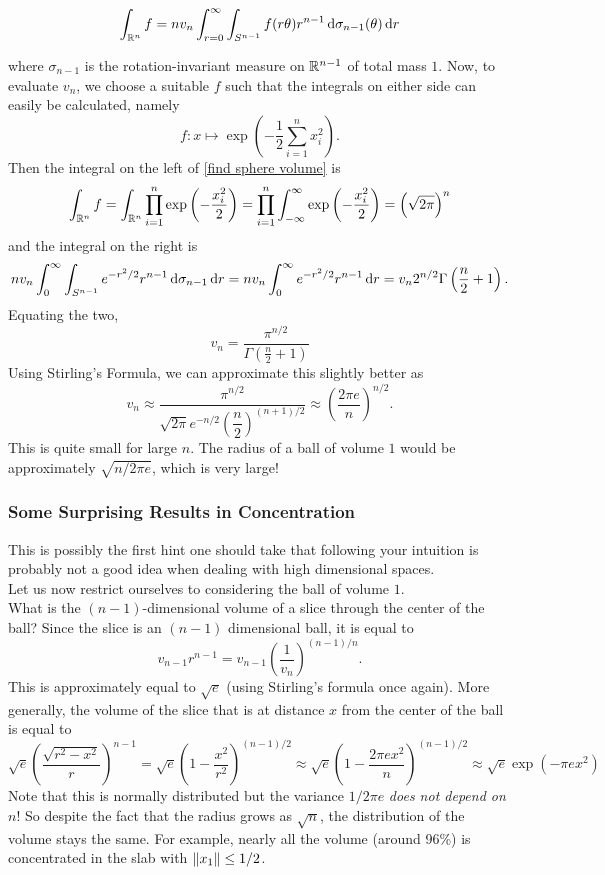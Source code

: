 \begin{equation}
\label{find sphere volume}
    \int_{\mathbb{R}^n} f = nv_n \int_{r=0}^\infty \int_{S^{n-1}} f(r\theta) r^{n-1} \operatorname{d}\!{\sigma}_{n-1}(\theta) \operatorname{d}\!{r}
\end{equation}

where $\sigma_{n-1}$ is the rotation-invariant measure on $\mathbb{R}^{n-1}$ of total mass $1$. Now, to evaluate $v_n$, we choose a suitable $f$ such that the integrals on either side can easily be calculated, namely
\[f: x\mapsto \exp\left(-\frac{1}{2}\sum_{i=1}^n x_i^2\right).\]
Then the integral on the left of \ref{find sphere volume} is
\[
\int_{\mathbb{R}^n}f = \int_{\mathbb{R}^n}\prod_{i=1}^n \exp\left(-\frac{x_i^2}{2}\right) = \prod_{i=1}^n \int_{-\infty}^\infty \exp\left(-\frac{x_i^2}{2}\right) = \left(\sqrt{2\pi}\right)^n
\]
and the integral on the right is
\[
nv_n\int_0^\infty \int_{S^{n-1}} e^{-r^2/2}r^{n-1}\operatorname{d}\!{\sigma}_{n-1}\operatorname{d}\!{r} = nv_n\int_0^\infty e^{-r^2/2}r^{n-1}\operatorname{d}\!{r} = v_n 2^{n/2}\Gamma\left(\frac{n}{2}+1\right).
\]
Equating the two,
\[ v_n = \frac{\pi^{n/2}}{\Gamma\left(\frac{n}{2}+1\right)} \]
Using Stirling's Formula, we can approximate this slightly better as
\[ v_n \approx \dfrac{\pi^{n/2}}{\sqrt{2\pi} e^{-n/2}\left(\dfrac{n}{2}\right)^{(n+1)/2}} \approx \left(\frac{2\pi e}{n}\right)^{n/2}. \]
This is quite small for large $n$. The radius of a ball of volume $1$ would be approximately $\sqrt{n/2\pi e}$, which is very large!\\

\subsubsection{Some Surprising Results in Concentration}

This is possibly the first hint one should take that following your intuition is probably not a good idea when dealing with high dimensional spaces.\\

Let us now restrict ourselves to considering the ball of volume $1$.\\
What is the $(n-1)$-dimensional volume of a slice through the center of the ball? Since the slice is an $(n-1)$ dimensional ball, it is equal to
\[ v_{n-1}r^{n-1} = v_{n-1}\left(\frac{1}{v_n}\right)^{(n-1)/n}. \]
This is approximately equal to $\sqrt{e}$ (using Stirling's formula once again). More generally, the volume of the slice that is at distance $x$ from the center of the ball is equal to
\[ \sqrt{e}\left(\frac{\sqrt{r^2-x^2}}{r}\right)^{n-1} =
\sqrt{e}\left(1-\frac{x^2}{r^2}\right)^{(n-1)/2} \approx
\sqrt{e}\left(1-\frac{2\pi ex^2}{n}\right)^{(n-1)/2} \approx \sqrt{e}\exp(-\pi e x^2)\]
Note that this is normally distributed but the variance $1/2\pi e$ \textit{does not depend on $n$}! So despite the fact that the radius grows as $\sqrt{n}$, the distribution of the volume stays the same. For example, nearly all the volume (around 96\%) is concentrated in the slab with $\left\lVert x_1\right\rVert\leq 1/2$.\\

